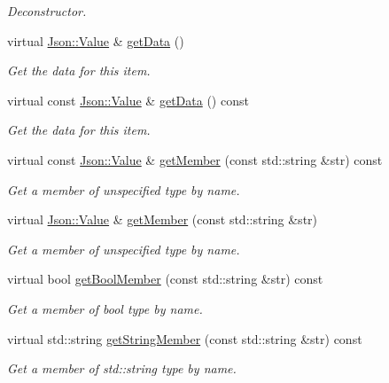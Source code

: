 \begin{DoxyCompactItemize}
\begin{DoxyCompactList}\small\item\em Deconstructor. \end{DoxyCompactList}\item 
virtual \hyperlink{class_json_1_1_value}{Json\-::\-Value} \& \hyperlink{class_a_w_e_media_item_a883413a36ee3258f614741af6c79c003}{get\-Data} ()
\begin{DoxyCompactList}\small\item\em Get the data for this item. \end{DoxyCompactList}\item 
virtual const \hyperlink{class_json_1_1_value}{Json\-::\-Value} \& \hyperlink{class_a_w_e_media_item_aa92ea60cc6290184e8b137ccbde8e22e}{get\-Data} () const 
\begin{DoxyCompactList}\small\item\em Get the data for this item. \end{DoxyCompactList}\item 
virtual const \hyperlink{class_json_1_1_value}{Json\-::\-Value} \& \hyperlink{class_a_w_e_media_item_a25e3819133184dccdbcebc01f5d232b8}{get\-Member} (const std\-::string \&str) const 
\begin{DoxyCompactList}\small\item\em Get a member of unspecified type by name. \end{DoxyCompactList}\item 
virtual \hyperlink{class_json_1_1_value}{Json\-::\-Value} \& \hyperlink{class_a_w_e_media_item_a8108de415a1e7893cfd0f63f88f0022f}{get\-Member} (const std\-::string \&str)
\begin{DoxyCompactList}\small\item\em Get a member of unspecified type by name. \end{DoxyCompactList}\item 
virtual bool \hyperlink{class_a_w_e_media_item_a12eeff7af4a27fa208166cf573e818d0}{get\-Bool\-Member} (const std\-::string \&str) const 
\begin{DoxyCompactList}\small\item\em Get a member of {\ttfamily bool} type by name. \end{DoxyCompactList}\item 
virtual std\-::string \hyperlink{class_a_w_e_media_item_a2def0777a7c0568d88e967f95907722c}{get\-String\-Member} (const std\-::string \&str) const 
\begin{DoxyCompactList}\small\item\em Get a member of {\ttfamily std\-::string} type by name. \end{DoxyCompactList}\item 

\end{DoxyCompactItemize}
